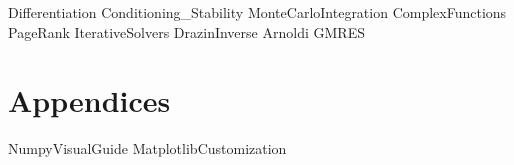 \documentclass[opener-c,labs,blue,nociteref]{HJnewsiambook}
\begin{document}
{Differentiation}
{Conditioning_Stability}
{MonteCarloIntegration}
{ComplexFunctions}
{PageRank}
{IterativeSolvers}
{DrazinInverse}
{Arnoldi}
{GMRES}

\fi

\part{Appendices} %
\begin{appendices}
{NumpyVisualGuide}
{MatplotlibCustomization}
\end{appendices}



\end{document}
